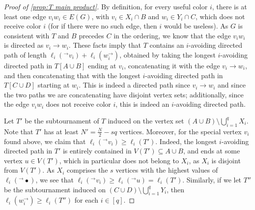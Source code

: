 \documentclass[11pt,reqno]{amsart}
\theoremstyle{definition}
\newcommand\1{\mathbf{1}}
\let\geq\geqslant
\begin{document}
\begin{proof}[Proof of \cref{prop:T main product}]
    By definition, for every useful color $i$, there is at least one edge $v_iw_i\in E(G)$, with $v_i \in X_i \cap B$ and $w_i \in Y_i \cap C$, which does not receive color $i$ (for if there were no such edge, then $i$ would be useless). As $G$ is consistent with $T$ and $B$ precedes $C$ in the ordering, we know that the edge $v_iw_i$ is directed as $v_i\to w_i$. These facts imply that $T$ contains an $i$-avoiding directed path of length $\ell_i(^\to v_i)+\ell_i(w_i^\to)$, obtained by taking the longest $i$-avoiding directed path in $T[A\cup B]$ ending at $v_i$, concatenating it with the edge $v_i\to w_i$, and then concatenating that with the longest $i$-avoiding directed path in $T[C\cup D]$ starting at $w_i$. This is indeed a directed path since $v_i \to w_i$ and since the two paths we are concatenating have disjoint vertex sets; additionally, since the edge $v_i w_i$ does not receive color $i$, this is indeed an $i$-avoiding directed path.

    Let $T'$ be the subtournament of $T$ induced on the vertex set $(A \cup B) \setminus \bigcup_{i=1}^q X_i$. Note that $T'$ has at least $N'=\frac N2 - sq$ vertices. Moreover, for the special vertex $v_i$ found above, we claim that $\ell_i(^\to v_i) \geq \ell_i(T')$. Indeed, the longest $i$-avoiding directed path in $T'$ is entirely contained in $V(T')\subseteq A\cup B$, and ends at some vertex $u \in V(T')$, which in particular does not belong to $X_i$, as $X_i$ is disjoint from $V(T')$. As $X_i$ comprises the $s$ vertices with the highest values of $\ell_i(^\to \bullet)$, we see that $\ell_i(^\to v_i) \geq \ell_i(^\to u)=\ell_i(T')$.  Similarly, if we let $T''$ be the subtournament induced on $(C \cup D) \setminus \bigcup_{i=1}^q Y_i$, then $\ell_i(w_i^\to) \geq \ell_i(T'')$ for each $i \in [q]$. 


\end{proof}
\end{document}
